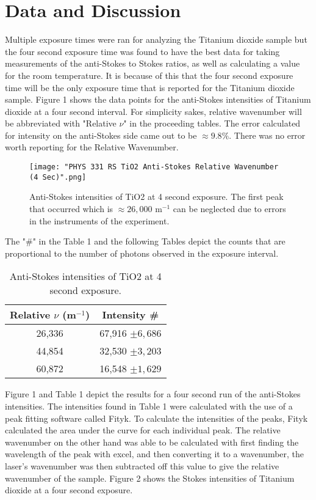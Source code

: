 \documentclass[twocolumn]{article}
\begin{document}
\section*{Data and Discussion}
Multiple exposure times were ran for analyzing the Titanium dioxide sample but the four second exposure time was found to have the best data for taking measurements of the anti-Stokes to Stokes ratios, as well as calculating a value for the room temperature. It is because of this that the four second exposure time will be the only exposure time that is reported for the Titanium dioxide sample. Figure 1 shows the data points for the anti-Stokes intensities of Titanium dioxide at a four second interval. For simplicity sakes, relative wavenumber will be abbreviated with "Relative $\nu$" in the proceeding tables. The error calculated for intensity on the anti-Stokes side came out to be $\approx 9.8\%$. There was no error worth reporting for the Relative Wavenumber.
\begin{figure}[htb]
\centering
\texttt{[image: "PHYS 331 RS TiO2 Anti-Stokes Relative Wavenumber (4 Sec)".png]}
\caption{Anti-Stokes intensities of TiO2 at 4 second exposure. The first peak that occurred which is $\approx 26,000$  m$^{-1}$ can be neglected due to errors in the instruments of the experiment.}
\end{figure}
\newline
The "$\#$" in the Table 1 and the following Tables depict the counts that are proportional to the number of photons observed in the exposure interval.
\begin{table}[htb]
\begin{center}
\begin{tabular}{|c|c|}
    \hline \textbf{Relative $\nu$ (m$^{-1}$)} & \textbf{Intensity \#} \\ \hline
    26,336 & 67,916 $\pm 6,686$ \\ \hline
    44,854 & 32,530 $\pm 3,203$ \\ \hline
    60,872 & 16,548 $\pm 1,629$ \\ \hline
\end{tabular}
\caption{\small{Anti-Stokes intensities of TiO2 at 4 second exposure.}}
\end{center}
\label{default}
\end{table}%
\newline
Figure 1 and Table 1 depict the results for a four second run of the anti-Stokes intensities. The intensities found in Table 1 were calculated with the use of a peak fitting software called Fityk. To calculate the intensities of the peaks, Fityk calculated the area under the curve for each individual peak. The relative wavenumber on the other hand was able to be calculated with first finding the wavelength of the peak with excel, and then converting it to a wavenumber, the laser's wavenumber was then subtracted off this value to give the relative wavenumber of the sample. Figure 2 shows the Stokes intensities of Titanium dioxide at a four second exposure.
\end{document}
